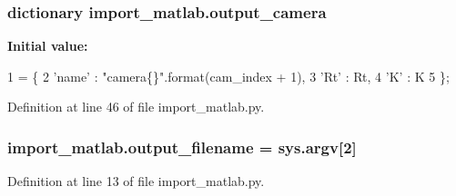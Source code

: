 \subsubsection[{\texorpdfstring{output\+\_\+camera}{output_camera}}]{\setlength{\rightskip}{0pt plus 5cm}dictionary import\+\_\+matlab.\+output\+\_\+camera}\hypertarget{namespaceimport__matlab_a2396c58f5f7eff335900411b0fa50b3b}{}\label{namespaceimport__matlab_a2396c58f5f7eff335900411b0fa50b3b}
{\bfseries Initial value\+:}
\begin{DoxyCode}
1 = \{
2         \textcolor{stringliteral}{'name'} : \textcolor{stringliteral}{"camera\{\}"}.format(cam\_index + 1),
3         \textcolor{stringliteral}{'Rt'} : Rt,
4         \textcolor{stringliteral}{'K'} : K
5     \};
\end{DoxyCode}


Definition at line 46 of file import\+\_\+matlab.\+py.

\subsubsection[{\texorpdfstring{output\+\_\+filename}{output_filename}}]{\setlength{\rightskip}{0pt plus 5cm}import\+\_\+matlab.\+output\+\_\+filename = sys.\+argv\mbox{[}2\mbox{]}}\hypertarget{namespaceimport__matlab_a51215342792268f23af9e7982d0569b7}{}\label{namespaceimport__matlab_a51215342792268f23af9e7982d0569b7}


Definition at line 13 of file import\+\_\+matlab.\+py.

